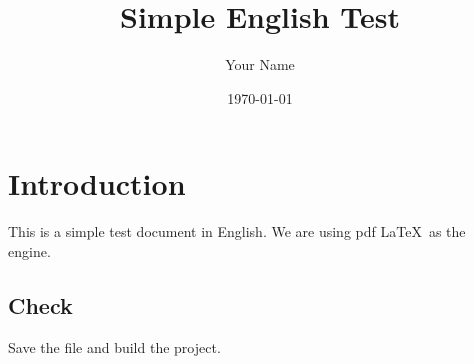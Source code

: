 \documentclass[12pt]{article}
\title{Simple English Test}
\author{Your Name}
\date{\today}
\begin{document}
\maketitle

\section{Introduction}
This is a simple test document in English. We are using pdf \LaTeX\ as the engine.
\subsection{Check}
Save the file and build the project.
\end{document}
